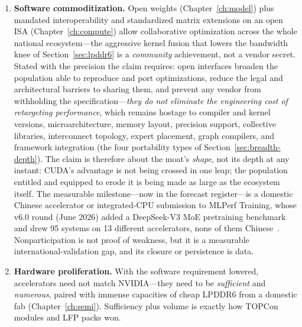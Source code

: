 \begin{enumerate}
  \item \textbf{Software commoditization.} Open weights (Chapter~\ref{ch:model}) plus mandated interoperability and standardized matrix extensions on an open ISA (Chapter~\ref{ch:compute}) allow collaborative optimization across the whole national ecosystem---the aggressive kernel fusion that lowers the bandwidth knee of Section~\ref{sec:lpddr6} is a \emph{community} achievement, not a vendor secret. Stated with the precision the claim requires: open interfaces broaden the population able to reproduce and port optimizations, reduce the legal and architectural barriers to sharing them, and prevent any vendor from withholding the specification---\emph{they do not eliminate the engineering cost of retargeting performance}, which remains hostage to compiler and kernel versions, microarchitecture, memory layout, precision support, collective libraries, interconnect topology, expert placement, graph compilers, and framework integration (the four portability types of Section~\ref{sec:breadth-depth}). The claim is therefore about the moat's \emph{shape}, not its depth at any instant: CUDA's advantage is not being crossed in one leap; the population entitled and equipped to erode it is being made as large as the ecosystem itself. The measurable milestone---now in the forecast register---is a domestic Chinese accelerator or integrated-CPU submission to MLPerf Training, whose v6.0 round (June 2026) added a DeepSeek-V3 MoE pretraining benchmark and drew 95 systems on 13 different accelerators, none of them Chinese~\cite{mlperf-v6}. Nonparticipation is not proof of weakness, but it is a measurable international-validation gap, and its closure or persistence is data.
  \item \textbf{Hardware proliferation.} With the software requirement lowered, accelerators need not match NVIDIA---they need to be \emph{sufficient} and \emph{numerous}, paired with immense capacities of cheap LPDDR6 from a domestic fab (Chapter~\ref{ch:semi}). Sufficiency plus volume is exactly how TOPCon modules and LFP packs won.

\end{enumerate}
